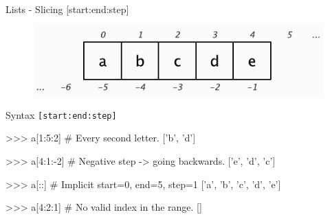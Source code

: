 \documentclass[10pt]{beamer}
\begin{document}
\begin{frame}[fragile]{Lists - Slicing [start:end:step]}

	\vspace*{-0.1cm}
	\begin{figure}[!h]
		\centering
		\includegraphics[width=0.6\linewidth]{img/slicing.pdf}
	\end{figure}

	\vspace*{-0.3cm}
	\pause
	Syntax \small{\texttt{[start:end:step]}}

	\pause
	\begin{pythoncode}
		>>> a[1:5:2]  # Every second letter.
		['b', 'd']
	\end{pythoncode}

	\pause
	\begin{pythoncode}
		>>> a[4:1:-2]  # Negative step -> going backwards.
		['e', 'd', 'c']
	\end{pythoncode}

	\pause
	\begin{pythoncode}
		>>> a[::]  # Implicit start=0, end=5, step=1
		['a', 'b', 'c', 'd', 'e']
	\end{pythoncode}

	\pause
	\begin{pythoncode}
		>>> a[4:2:1]  # No valid index in the range.
		[]
	\end{pythoncode}
\end{frame}
\end{document}
